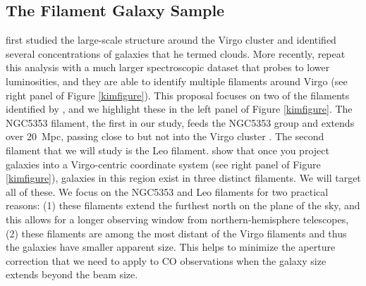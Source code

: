 \documentclass[11pt, preprint]{aastex}
\newcommand{\ha}{$H\alpha$}
\begin{document}
 

\vspace*{-1cm}\subsection{The Filament Galaxy Sample} 
\vspace*{-.4cm}
\citet{tully82} first studied the large-scale structure around the Virgo
cluster and identified several concentrations of galaxies that he
termed clouds.  More recently, \citet{kim16} repeat this analysis with
a much larger spectroscopic dataset that probes to lower luminosities,
and they are able to identify multiple
filaments around Virgo (see right panel of Figure \ref{kimfigure}).
This proposal focuses on two of the filaments identified by
\citet{kim16}, and we highlight these in the left panel of Figure
\ref{kimfigure}.  The NGC5353 filament, the first in our study, feeds the NGC5353 group and extends over 20~Mpc,
passing close to but not into the Virgo cluster \citep{kim16}.  The second filament
that we will study is the Leo filament.  \citet{kim16} show that once
you project galaxies into a Virgo-centric coordinate system (see right
panel of Figure \ref{kimfigure}), galaxies
in this region exist in three distinct filaments.  We will target all
of these.  We focus on
the NGC5353 and Leo filaments for two practical reasons:  (1) these filaments
extend the furthest north on the plane of the sky, and this allows
for a longer observing window from northern-hemisphere telescopes, (2)
these filaments are among the most distant of the Virgo filaments and
thus the galaxies have smaller apparent size.  This helps to minimize
the aperture correction that we need to apply to CO observations when the galaxy size extends beyond the beam size.  
\end{document}
